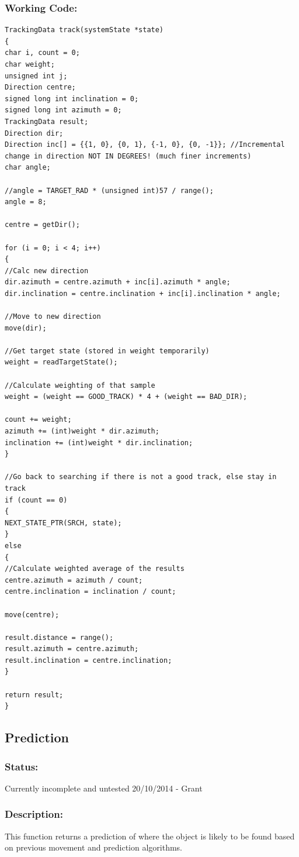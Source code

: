 \documentclass[]{report}
\begin{document}
\subsubsection{Working Code:}
\begin{lstlisting}
TrackingData track(systemState *state)
{
char i, count = 0;
char weight;
unsigned int j;
Direction centre;
signed long int inclination = 0;
signed long int azimuth = 0;
TrackingData result;
Direction dir;
Direction inc[] = {{1, 0}, {0, 1}, {-1, 0}, {0, -1}}; //Incremental change in direction NOT IN DEGREES! (much finer increments)
char angle;

//angle = TARGET_RAD * (unsigned int)57 / range();
angle = 8;

centre = getDir();

for (i = 0; i < 4; i++)
{
//Calc new direction
dir.azimuth = centre.azimuth + inc[i].azimuth * angle;
dir.inclination = centre.inclination + inc[i].inclination * angle;

//Move to new direction
move(dir);

//Get target state (stored in weight temporarily)
weight = readTargetState();

//Calculate weighting of that sample
weight = (weight == GOOD_TRACK) * 4 + (weight == BAD_DIR);

count += weight;
azimuth += (int)weight * dir.azimuth;
inclination += (int)weight * dir.inclination;
}

//Go back to searching if there is not a good track, else stay in track
if (count == 0)
{
NEXT_STATE_PTR(SRCH, state);
}
else
{
//Calculate weighted average of the results
centre.azimuth = azimuth / count;
centre.inclination = inclination / count;

move(centre);

result.distance = range();
result.azimuth = centre.azimuth;
result.inclination = centre.inclination;
}

return result;
}
\end{lstlisting}

\subsection{Prediction}
\subsubsection{Status:}
Currently incomplete and untested 20/10/2014 - Grant

\subsubsection{Description:}
This function returns a prediction of where the object is likely to be found based on previous movement and prediction algorithms.
\end{document}

